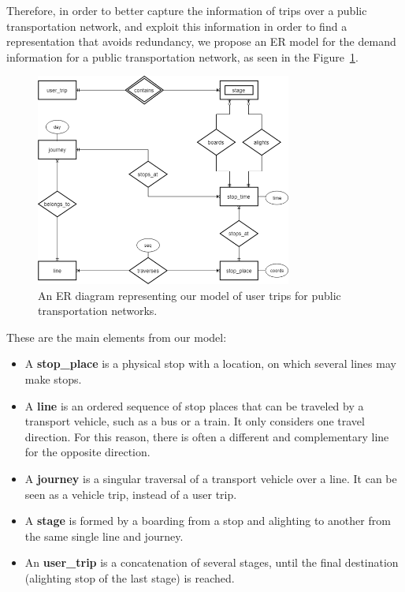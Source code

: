 	Therefore, in order to better capture the information of trips over a public transportation network, and exploit this information in order to find a representation that avoids redundancy, we propose an ER model for the demand information for a public transportation network, as seen in the Figure~\ref{fig:er}.
	
	\begin{figure}[ht]
	    \begin{center}
        \includegraphics[width=0.75\textwidth]{figures/network_er.png}
        \caption{An ER diagram representing our model of user trips for public transportation networks.}
        \label{fig:er}
        \end{center}
    \end{figure}
    
    These are the main elements from our model:
    \begin{itemize}
        \item A \textbf{stop\_place} is a physical stop with a location, on which several lines may make stops.
        \item A \textbf{line} is an ordered sequence of stop places that can be traveled by a transport vehicle, such as a bus or a train. It only considers one travel direction. For this reason, there is often a different and complementary line for the opposite direction.%
        \item A \textbf{journey} is a singular traversal of a transport vehicle over a line. It can be seen as a vehicle trip, instead of a user trip.
        \item A \textbf{stage} is formed by a boarding from a stop and alighting to another from the same single line and journey.
        \item An \textbf{user\_trip} is a concatenation of several stages, until the final destination (alighting stop of the last stage) is reached.
    \end{itemize}
	
